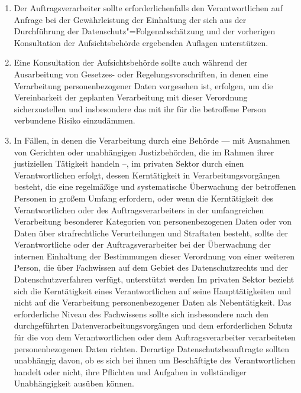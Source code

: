 \begin{enumerate}

   \item Der Auftragsverarbeiter sollte erforderlichenfalls den Verantwortlichen auf Anfrage bei der Gewährleistung der
    Einhaltung der sich aus der Durchführung der Datenschutz"=Folgenabschätzung und der vorherigen Konsultation der
    Aufsichtsbehörde ergebenden Auflagen unterstützen.%
   \label{eg:95}
   

   \item Eine Konsultation der Aufsichtsbehörde sollte auch während der Ausarbeitung von Gesetzes- oder
    Regelungsvorschriften, in denen eine Verarbeitung personenbezogener Daten vorgesehen ist, erfolgen, um die
    Vereinbarkeit der geplanten Verarbeitung mit dieser Verordnung sicherzustellen und insbesondere das mit ihr für die
    betroffene Person verbundene Risiko einzudämmen.%
   \label{eg:96}
   

   \item In Fällen, in denen die Verarbeitung durch eine Behörde — mit Ausnahmen von Gerichten oder unabhängigen
    Justizbehörden, die im Rahmen ihrer justiziellen Tätigkeit handeln –, im privaten Sektor durch einen
    Verantwortlichen erfolgt, dessen Kerntätigkeit in Verarbeitungsvorgängen besteht, die eine regelmäßige und
    systematische Überwachung der betroffenen Personen in großem Umfang erfordern, oder wenn die Kerntätigkeit des
    Verantwortlichen oder des Auftragsverarbeiters in der umfangreichen Verarbeitung besonderer Kategorien von
    personenbezogenen Daten oder von Daten über strafrechtliche Verurteilungen und Straftaten besteht, sollte der
    Verantwortliche oder der Auftragsverarbeiter bei der Überwachung der internen Einhaltung der Bestimmungen dieser
    Verordnung von einer weiteren Person, die über Fachwissen auf dem Gebiet des Datenschutzrechts und der
    Datenschutzverfahren verfügt, unterstützt werden Im privaten Sektor bezieht sich die Kerntätigkeit eines
    Verantwortlichen auf seine Haupttätigkeiten und nicht auf die Verarbeitung personenbezogener Daten als
    Nebentätigkeit. Das erforderliche Niveau des Fachwissens sollte sich insbesondere nach den durchgeführten
    Datenverarbeitungsvorgängen und dem erforderlichen Schutz für die von dem Verantwortlichen oder dem
    Auftragsverarbeiter verarbeiteten personenbezogenen Daten richten. Derartige Datenschutzbeauftragte sollten
    unabhängig davon, ob es sich bei ihnen um Beschäftigte des Verantwortlichen handelt oder nicht, ihre Pflichten und
    Aufgaben in vollständiger Unabhängigkeit ausüben können.%
   \label{eg:97}
   

\end{enumerate}
